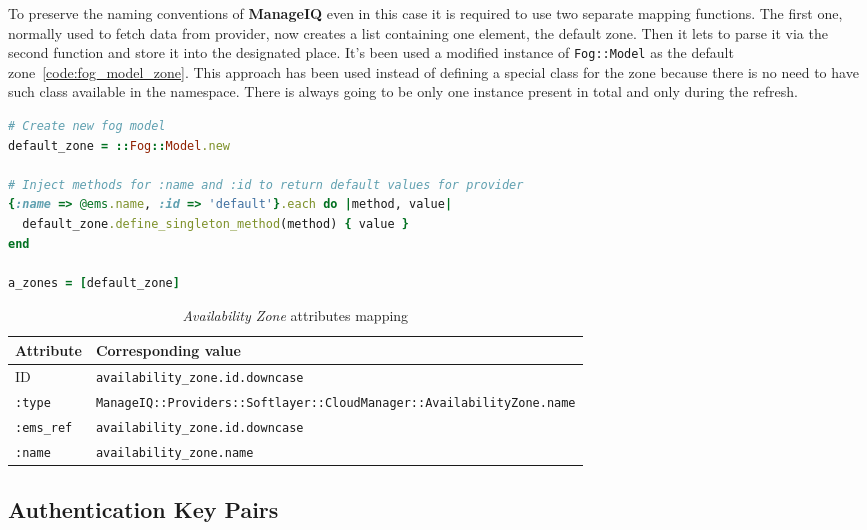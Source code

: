 To preserve the naming conventions of \textbf{ManageIQ} even in this case it is required to use two separate mapping functions. The first one, normally used to fetch data from provider, now creates a list containing one element, the default zone. Then it lets to parse it via the second function and store it into the designated place. It's been used a modified instance of \texttt{Fog::Model} as the default zone~\ref{code:fog_model_zone}. This approach has been used instead of defining a special class for the zone because there is no need to have such class available in the namespace. There is always going to be only one instance present in total and only during the refresh.

\begin{lstlisting}[language=Ruby,caption={Declaration of the default \emph{Availability Zone}},label=code:fog_model_zone,float=htpb]
# Create new fog model
default_zone = ::Fog::Model.new

# Inject methods for :name and :id to return default values for provider
{:name => @ems.name, :id => 'default'}.each do |method, value|
  default_zone.define_singleton_method(method) { value }
end

a_zones = [default_zone]
\end{lstlisting}

\begin{table}[ht]
	\centering
	\caption{\emph{Availability Zone} attributes mapping}\label{tab:Availability Zone attributes mapping}
	\begin{tabular}{ll}
		\toprule
		Attribute          & Corresponding value                                                                \\
		\midrule
		ID                 & \texttt{availability\_zone.id.downcase}                                            \\
		\texttt{:type}     & \small\texttt{ManageIQ::Providers::Softlayer::CloudManager::AvailabilityZone.name} \\
		\texttt{:ems\_ref} & \texttt{availability\_zone.id.downcase}                                            \\
		\texttt{:name}     & \texttt{availability\_zone.name}                                                   \\
		\bottomrule
	\end{tabular}
\end{table}

\subsection{Authentication Key Pairs}
\label{sub:Authentication Key Pairs}


